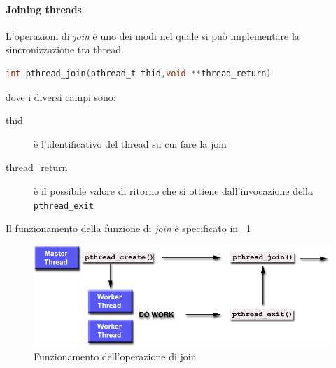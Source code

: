 \paragraph{Joining threads}
L'operazioni di \emph{join} è uno dei modi nel quale si può implementare la sincronizzazione tra thread.
\begin{lstlisting}[language=C]
int pthread_join(pthread_t thid,void **thread_return)
\end{lstlisting}
dove i diversi campi sono:
\begin{description}
\item[thid] è l'identificativo del thread su cui fare la join
\item[thread\_return] è il possibile valore di ritorno che si ottiene dall'invocazione della \texttt{pthread\_exit}
\end{description}
Il funzionamento della funzione di \emph{join} è specificato in \figurename\, \ref{fig:join}
\begin{figure}[htb]
\centering
\includegraphics[scale=0.7]{img/join.png}
\caption{Funzionamento dell'operazione di join}\label{fig:join}
\end{figure}
